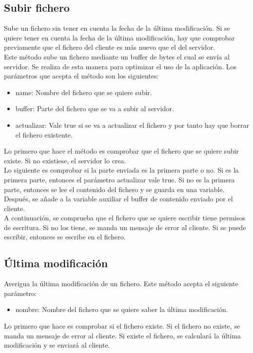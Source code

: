 \subsection{Subir fichero}
Sube un fichero sin tener en cuenta la fecha de la última modificación. Si se quiere tener en cuenta la fecha de la última modificación, hay que comprobar previamente que el fichero del cliente es más nuevo que el del servidor.
\\
Este método sube un fichero mediante un buffer de bytes el cual se envía al servidor. Se realiza de esta manera para optimizar el uso de la aplicación. Los parámetros que acepta el método son los siguientes:
\begin{itemize}
	\item name: Nombre del fichero que se quiere subir.
	\item buffer: Parte del fichero que se va a subir al servidor.
	\item actualizar: Vale true si se va a actualizar el fichero y por tanto hay que borrar el fichero existente.
\end{itemize}
Lo primero que hace el método es comprobar que el fichero que se quiere subir existe.  Si no existiese, el servidor lo crea.\\ Lo siguiente es comprobar si la parte enviada es la primera parte o no. Si es la primera parte, entonces el parámetro actualizar vale true. Si no es la primera parte, entonces se lee el contenido del fichero y se guarda en una variable.\\ Después, se añade a la variable auxiliar el buffer de contenido enviado por el cliente.\\ A continuación, se comprueba que el fichero que se quiere escribir tiene permisos de escritura. Si no los tiene, se manda un mensaje de error al cliente. Si se puede escribir, entonces se escribe en el fichero.

\subsection{Última modificación}
Averigua la última modificación de un fichero.
Este método acepta el siguiente parámetro:
\begin{itemize}
	\item nombre: Nombre del fichero que se quiere saber la última modificación.
\end{itemize}
Lo primero que hace es comprobar si el fichero existe. Si el fichero no existe, se manda un mensaje de error al cliente. Si existe el fichero, se calculará la última modificación y se enviará al cliente.
